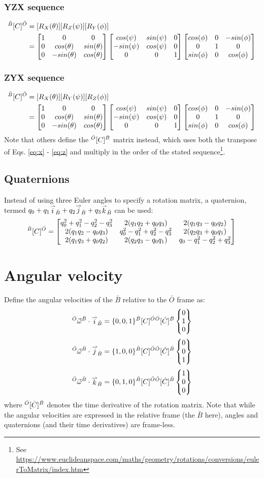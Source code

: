 \documentclass{article}
\begin{document}
\subsubsection{YZX sequence}
\begin{equation}
    \begin{split}
         {}^{\bar{B}}\lbrack{C}\rbrack^{\bar{O}} & = [R_{{X}}({\theta})][R_{{Z}}({\psi})][R_{{Y}}({\phi})] \\
         & = \begin{bmatrix} 1 & 0 & 0 \\ 0 & cos(\theta) & sin(\theta) \\ 0 & -sin(\theta) & cos(\theta) \end{bmatrix}  \begin{bmatrix} cos(\psi) & sin(\psi) & 0 \\ -sin(\psi) & cos(\psi) & 0 \\ 0 & 0 & 1 \end{bmatrix}  \begin{bmatrix} cos(\phi) & 0 & -sin(\phi) \\ 0 & 1 & 0 \\ sin(\phi) & 0& cos(\phi) \end{bmatrix} 
    \end{split}
\end{equation}
\subsubsection{ZYX sequence}
\begin{equation}
    \begin{split}
         {}^{\bar{B}}\lbrack{C}\rbrack^{\bar{O}} & = [R_{{X}}({\theta})][R_{{Y}}({\psi})][R_{{Z}}({\phi})] \\
         & = \begin{bmatrix} 1 & 0 & 0 \\ 0 & cos(\theta) & sin(\theta) \\ 0 & -sin(\theta) & cos(\theta) \end{bmatrix}  \begin{bmatrix} cos(\psi) & sin(\psi) & 0 \\ -sin(\psi) & cos(\psi) & 0 \\ 0 & 0 & 1 \end{bmatrix}  \begin{bmatrix} cos(\phi) & 0 & -sin(\phi) \\ 0 & 1 & 0 \\ sin(\phi) & 0& cos(\phi) \end{bmatrix} 
    \end{split}
\end{equation}
Note that others define the $ {}^{\bar{O}}\lbrack{C}\rbrack^{\bar{B}}$ matrix instead, which uses both the transpose of Eqs. \ref{eq:x} - \ref{eq:z} and multiply in the order of the stated sequence\footnote{See \href{https://www.euclideanspace.com/maths/geometry/rotations/conversions/eulerToMatrix/index.htm}{https://www.euclideanspace.com/maths/geometry/rotations/conversions/eulerToMatrix/index.htm}}. 


\subsection{Quaternions}
\label{subsec:quats}
Instead of using three Euler angles to specify a rotation matrix, a quaternion, termed $\QuatDef{B}$ can be used:
\begin{equation}
     {}^{\bar{B}}\lbrack{C}\rbrack^{\bar{O}} =  \begin{bmatrix} q^2_0 + q^2_1 - q^2_2 - q^2_3 & 2(q_1q_2 + q_0q_3) & 2(q_1q_3 - q_0q_2) \\ 2(q_1q_2 - q_0q_3) & q^2_0 - q^2_1 + q^2_2 - q^2_3 & 2(q_2q_3 + q_0q_1) \\ 2(q_1q_3 + q_0q_2) & 2(q_2q_3 - q_0q_1) & q_0 - q^2_1 - q^2_2 + q^2_3 \end{bmatrix} {}
\end{equation}
% 



\section{Angular velocity}
\label{sec:angvel}
Define the angular velocities of the $\bar{B}$ relative to the $\bar{O}$ frame as:
\begin{equation}
    \AngVel{O}{B}\cdot\UnitVec{i}{B} = \wX{B}{O}
    \label{eq:wx}
\end{equation}
%
\begin{equation}
    \AngVel{O}{B}\cdot\UnitVec{j}{B} = \wY{B}{O}
    \label{eq:wy}
\end{equation}
%
\begin{equation}
    \AngVel{O}{B}\cdot\UnitVec{k}{B} = \wZ{B}{O}
    \label{eq:wz}
\end{equation}
%
where $ {}^{\bar{O}}\lbrack{\dot{C}}\rbrack^{\bar{B}}$ denotes the time derivative of the rotation matrix. Note that while the angular velocities are expressed in the relative frame (the $\bar{B}$ here), angles and quaternions (and their time derivatives) are frame-less. 
%
\end{document}
